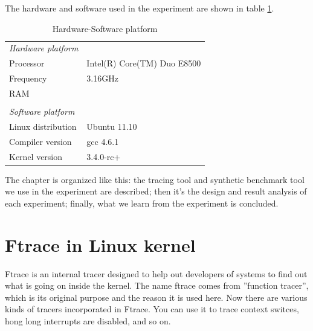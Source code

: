 The hardware and software used in the experiment are shown in 
table \ref{tab:exp_setup}.
\begin{table}[H]%
  \centering
  \begin{tabular}{ll}\hline
	\emph{Hardware platform}\hspace{4cm}		& 	\\
	Processor			& Intel(R) Core(TM) Duo E8500	 \\
	Frequency			& 3.16GHz\\
	RAM				& 	  \\	
					&	\\	
	\emph{Software platform}\hspace{4cm}		& 	\\
	Linux distribution		& Ubuntu 11.10\\
	Compiler version		& gcc 4.6.1\\
	Kernel version			& 3.4.0-rc+ \\\hline
  \end{tabular}
  \caption{Hardware-Software platform}
  \label{tab:exp_setup}
\end{table}
The chapter is organized like this: the tracing tool and synthetic 
benchmark tool we use in the experiment are described; then it's the 
design and result analysis of each experiment; finally, what we learn
from the experiment is concluded.

\section{Ftrace in Linux kernel}
Ftrace\cite{ftrace} is an internal tracer designed to help out developers of systems to
find out what is going on inside the kernel. The name ftrace comes from
''function tracer'', which is its original purpose and the reason it is 
used here. Now there are various kinds of tracers incorporated in Ftrace.
You can use it to trace context switces, hong long interrupts are disabled,
and so on.


